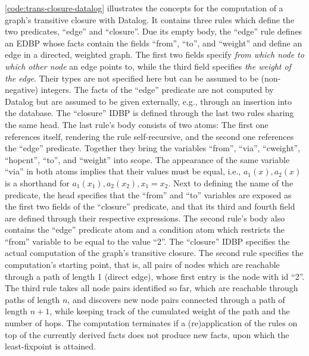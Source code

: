 \ref{code:trans-closure-datalog} illustrates the concepts for the
computation of a graph's transitive closure with Datalog.
It contains three rules which define the two predicates, ``edge'' and ``closure''.
Due its empty body, the ``edge'' rule defines an \ac{EDBP} whose facts
contain the fields ``from'', ``to'', and ``weight'' and define an edge
in a directed, weighted graph.
The first two fields specify \emph{from which node to which other node} an edge
points to, while the third field specifies \emph{the weight of the edge}.
Their types are not specified here but can be assumed to be (non-negative) integers.
The facts of the ``edge'' predicate are not computed by Datalog but
are assumed to be given externally, e.g., through an insertion into the database.
The ``closure'' \ac{IDBP} is defined through the last two rules sharing
the same head.
The last rule's body consists of two atoms: The first one references itself,
rendering the rule self-recursive, and the second one references the ``edge'' predicate.
Together they bring the variables ``from'', ``via'', ``cweight'', ``hopcnt'',
``to'', and ``weight'' into scope.
The appearance of the same variable ``via'' in both atoms implies that their
values must be equal, i.e.,
\(a_1(x), a_2(x)\) is a shorthand for \(a_1(x_1), a_2(x_2), x_1 = x_2\).
Next to defining the name of the predicate, the head specifies that the ``from''
and ``to'' variables are exposed as the first two fields of the ``closure'' predicate,
and that its third and fourth field are defined through their respective expressions.
The second rule's body also contains the ``edge'' predicate atom and a condition
atom which restricts the ``from'' variable to be equal to the value ``2''.
The ``closure'' \ac{IDBP} specifies the actual computation of the graph's
transitive closure.
The second rule specifies the computation's starting point,
that is, all pairs of nodes which are reachable through a path of length 1
(direct edge), whose first entry is the node with id ``2''.
The third rule takes all node pairs identified so far, which are reachable
through paths of length \(n\), and discovers new node pairs connected
through a path of length \(n + 1\),
while keeping track of the cumulated weight of the path and the number of hops.
The computation terminates if a (re)application of the rules on top of the
currently derived facts does not produce new facts,
upon which the least-fixpoint is attained.

